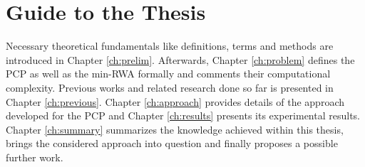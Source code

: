 \section{Guide to the Thesis}

Necessary theoretical fundamentals like definitions, terms and methods are introduced in Chapter \ref{ch:prelim}. Afterwards, Chapter \ref{ch:problem} defines the PCP as well as the min-RWA formally and comments their computational complexity. Previous works and related research done so far is presented in Chapter \ref{ch:previous}. Chapter \ref{ch:approach} provides details of the approach developed for the PCP and Chapter \ref{ch:results} presents its experimental results. Chapter \ref{ch:summary} summarizes the knowledge achieved within this thesis, brings the considered approach into question and finally proposes a possible further work.